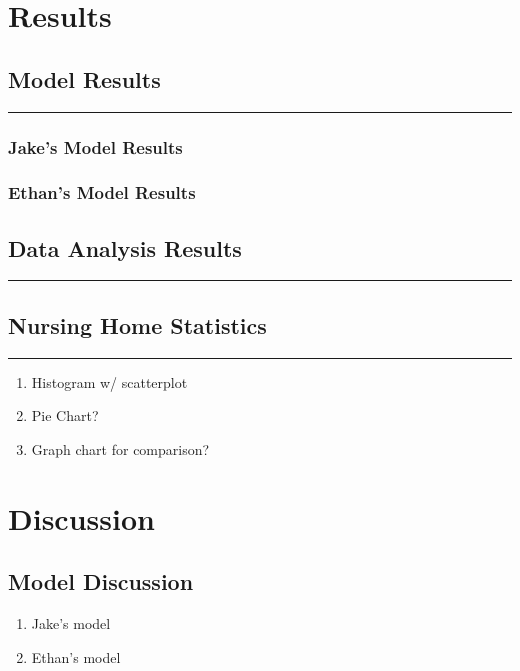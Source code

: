 \documentclass[twoside]{article}
\begin{document}
\begin{multicols}{2}
		\section{Results}
		\subsection{Model Results}
		\rule{\linewidth}{0.25pt}
		
		\subsubsection{Jake's Model Results}
		
		\subsubsection{Ethan's Model Results}
		
		\subsection{Data Analysis Results}
		\rule{\linewidth}{0.25pt}
		

		
	
		
		\subsection{Nursing Home Statistics}
		\rule{\linewidth}{0.25pt}
		
		\begin{enumerate}
			\item Histogram w/ scatterplot 
			\item Pie Chart?
			\item Graph chart for comparison?
		\end{enumerate}
		
		
		\section{Discussion}
		
		\subsection{Model Discussion}
		
		\begin{enumerate}
			\item Jake's model
			\item Ethan's model
		\end{enumerate}
		

\end{multicols}
\end{document}
